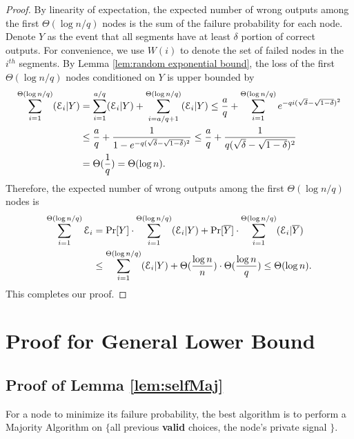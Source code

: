 \documentclass[a4paper,UKenglish]{lipics}
\theoremstyle{definition}
\begin{document}
\begin{proof}
By linearity of expectation, the expected number of wrong outputs among the first $\Theta(\log n/q)$ nodes 
	is the sum of the failure probability for each node. 
Denote $Y$ as the event that all segments have at least $\delta$ portion of correct outputs.
For convenience, we use $W(i)$ to denote the set of failed nodes in the $i^{th}$ segments.
By Lemma \ref{lem:random exponential bound}, the loss of the first $\Theta(\log n/q)$ nodes conditioned on $Y$ is upper bounded by
\begin{align*}
	\sum_{i=1}^{\Theta(\log n/q)} (\mathcal{E}_i|Y)
& =
	\sum_{i=1}^{a/q} (\mathcal{E}_i|Y) + \sum_{i=a/q+1}^{\Theta(\log n/q)} (\mathcal{E}_i|Y)
	\le
	{a \over q} + \sum_{i=1}^{\Theta(\log n/q)} e^{-qi(\sqrt{\delta} - \sqrt{1 - \delta})^2} \\
& \le
	{a \over q} + { 1 \over 1 - e^{-q(\sqrt{\delta} - \sqrt{1 - \delta})^2} }
	\le
	{a \over q} + {1 \over q(\sqrt{\delta} - \sqrt{1 - \delta})^2 } \\
& =
	\Theta ({1\over q})
	=
	\Theta(\log n).
\end{align*}
Therefore, the expected number of wrong outputs among the first $\Theta(\log n/q)$ nodes is
\begin{align*}
	\sum_{i=1}^{\Theta(\log n/q)} \mathcal{E}_i
& =
	\Pr[Y]\cdot \sum_{i=1}^{\Theta(\log n/q)} (\mathcal{E}_i|Y) + \Pr[\overline Y]\cdot \sum_{i=1}^{\Theta(\log n/q)} (\mathcal{E}_i|\overline Y) \\
& \le
	\sum_{i=1}^{\Theta(\log n/q)} (\mathcal{E}_i|Y) +  \Theta({\log n \over n})\cdot \Theta({\log n \over q})
	\le
	\Theta(\log n).
\end{align*}
This completes our proof.
\end{proof}









\section{Proof for General Lower Bound}

\subsection{Proof of Lemma \ref{lem:selfMaj}}
\label{subsec:selfMaj}

For a node to minimize its failure probability, 
	the best algorithm is to perform a Majority Algorithm on 
	$\{$all previous \textbf{valid} choices, the node's private signal $\}$.
\end{document}
